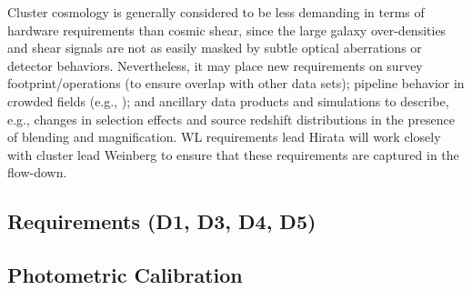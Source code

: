 Cluster cosmology is generally considered to be less demanding in terms of hardware requirements than
cosmic shear, since the large galaxy over-densities and shear signals are not as easily masked by
subtle optical aberrations or detector behaviors. Nevertheless, it may place new requirements
on survey footprint/operations (to ensure overlap with other data sets); pipeline behavior in
crowded fields (e.g., \cite{2015MNRAS.449.1259S}); and ancillary data products and simulations to describe, e.g., changes in selection
effects and source redshift distributions in the presence of blending and magnification.
WL requirements lead Hirata will work closely with cluster lead Weinberg to ensure that these
requirements are captured in the flow-down.

%
%

\subsection{Requirements (D1, D3, D4, D5)}
\label{sec:wl_requirements}


\subsection{Photometric Calibration}
\label{sec:wl_calibration}

